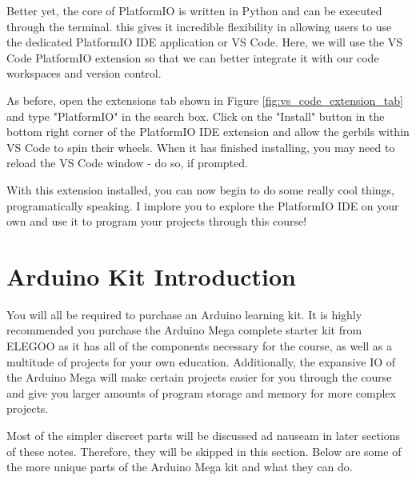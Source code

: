     Better yet, the core of PlatformIO is written in Python and can be executed through the terminal.
    this gives it incredible flexibility in allowing users to use the dedicated PlatformIO IDE application or VS Code.
    Here, we will use the VS Code PlatformIO extension so that we can better integrate it with our code workspaces and version control.

    As before, open the extensions tab shown in Figure \ref{fig:vs_code_extension_tab} and type "PlatformIO" in the search box.
    Click on the "Install" button in the bottom right corner of the PlatformIO IDE extension and allow the gerbils within VS Code to spin their wheels.
    When it has finished installing, you may need to reload the VS Code window - do so, if prompted.

    With this extension installed, you can now begin to do some really cool things, programatically speaking.
    I implore you to explore the PlatformIO IDE on your own and use it to program your projects through this course!

\pagebreak

\section*{Arduino Kit Introduction}

You will all be required to purchase an Arduino learning kit. 
It is highly recommended you purchase the Arduino Mega complete starter kit from ELEGOO as it has all of the components necessary for the course, as well as a multitude of projects for your own education.
Additionally, the expansive IO of the Arduino Mega will make certain projects easier for you through the course and give you larger amounts of program storage and memory for more complex projects.

Most of the simpler discreet parts will be discussed ad nauseam in later sections of these notes.
Therefore, they will be skipped in this section.
Below are some of the more unique parts of the Arduino Mega kit and what they can do.
    
